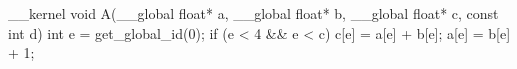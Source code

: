 __kernel void A(__global float* a,
                __global float* b,
                __global float* c,
                const int d) {
  int e = get_global_id(0);
  if (e < 4 && e < c) {
    c[e] = a[e] + b[e];
    a[e] = b[e] + 1;
  }
}
